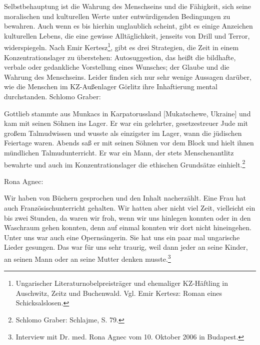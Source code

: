 Selbstbehauptung ist die Wahrung des Menschseins und die Fähigkeit, sich seine moralischen und kulturellen Werte unter entwürdigenden Bedingungen zu bewahren. Auch wenn es bis hierhin unglaublich scheint, gibt es einige Anzeichen kulturellen Lebens, die eine gewisse Alltäglichkeit, jenseits von Drill und Terror, widerspiegeln. Nach Emir Kertesz\footnote{Ungarischer Literaturnobelpreisträger und ehemaliger KZ-Häftling in Auschwitz, Zeitz und Buchenwald. Vgl. Emir Kertesz: Roman eines Schicksalslosen.}, gibt es drei Strategien, die Zeit in einem Konzentrationslager zu überstehen: Autosuggestion, das heißt die bildhafte, verbale oder gedankliche Vorstellung eines Wunsches; der Glaube und die Wahrung des Menschseins.
Leider finden sich nur sehr wenige Aussagen darüber, wie die Menschen im KZ-Außenlager Görlitz ihre Inhaftierung mental durchstanden.\newline
Schlomo Graber:
\begin{leftbar}
Gottlieb stammte aus Munkacs in Karpatorussland  [Mukatschewe, Ukraine] und kam mit seinen Söhnen ins Lager. Er war ein gelehrter, gesetzestreuer Jude mit großem Talmudwissen und wusste als einzigster im Lager, wann die jüdischen Feiertage waren. Abends saß er mit seinen Söhnen vor dem Block und hielt ihnen mündlichen Talmudunterricht. Er war ein Mann, der stets Menschenantlitz bewahrte und auch im Konzentrationslager die ethischen Grundsätze einhielt.\footnote{Schlomo Graber: Schlajme, S. 79.}
\end{leftbar}

Rona Agnec:
\begin{leftbar}
Wir haben von Büchern gesprochen und den Inhalt nacherzählt. Eine Frau hat auch Französischunterricht gehalten. Wir hatten aber nicht viel Zeit, vielleicht ein bis zwei Stunden, da waren wir froh, wenn wir uns hinlegen konnten oder in den Waschraum gehen konnten, denn auf einmal konnten wir dort nicht hineingehen. Unter uns war auch eine Opernsängerin. Sie hat uns ein paar mal ungarische Lieder gesungen. Das war für uns sehr traurig, weil dann jeder an seine Kinder, an seinen Mann oder an seine Mutter denken musste.\footnote{Interview mit Dr. med. Rona Agnec vom 10. Oktober 2006 in Budapest.}
\end{leftbar}

